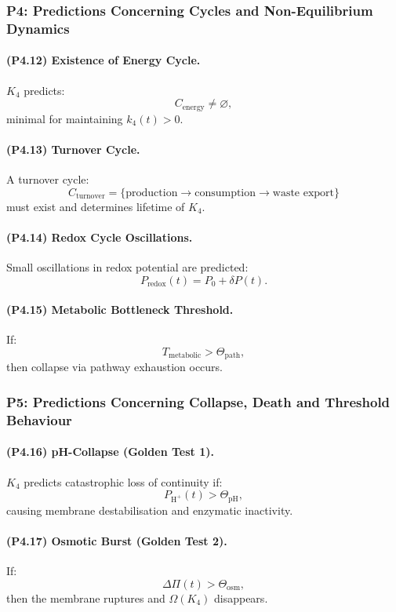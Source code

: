 \subsubsection{P4: Predictions Concerning Cycles and Non-Equilibrium Dynamics}

\paragraph{(P4.12) Existence of Energy Cycle.}
$K_4$ predicts:
\[
C_{\mathrm{energy}} \neq \varnothing,
\]
minimal for maintaining $k_4(t)>0$.

\paragraph{(P4.13) Turnover Cycle.}
A turnover cycle:
\[
C_{\mathrm{turnover}} = 
\{\text{production} \to \text{consumption} \to \text{waste export}\}
\]
must exist and determines lifetime of $K_4$.

\paragraph{(P4.14) Redox Cycle Oscillations.}
Small oscillations in redox potential are predicted:
\[
P_{\mathrm{redox}}(t) = P_0 + \delta P(t).
\]

\paragraph{(P4.15) Metabolic Bottleneck Threshold.}
If:
\[
T_{\mathrm{metabolic}} > \Theta_{\mathrm{path}},
\]
then collapse via pathway exhaustion occurs.

\subsubsection{P5: Predictions Concerning Collapse, Death and Threshold Behaviour}

\paragraph{(P4.16) pH-Collapse (Golden Test 1).}
$K_4$ predicts catastrophic loss of continuity if:
\[
P_{\mathrm{H}^+}(t) > \Theta_{\mathrm{pH}},
\]
causing membrane destabilisation and enzymatic inactivity.

\paragraph{(P4.17) Osmotic Burst (Golden Test 2).}
If:
\[
\Delta \Pi(t) > \Theta_{\mathrm{osm}},
\]
then the membrane ruptures and $\Omega(K_4)$ disappears.

